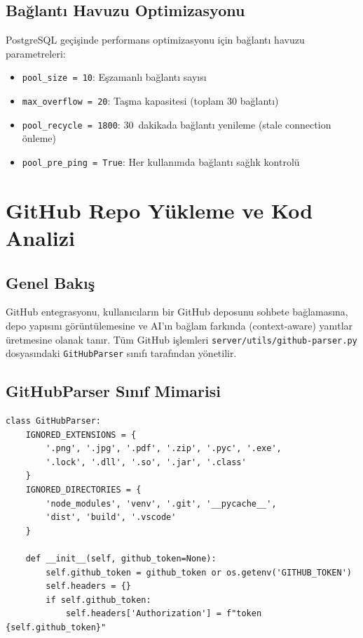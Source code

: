 \documentclass[12pt,a4paper]{article}
\begin{document}
\subsection{Bağlantı Havuzu Optimizasyonu}

PostgreSQL geçişinde performans optimizasyonu için bağlantı havuzu parametreleri:

\begin{itemize}
    \item \texttt{pool\_size = 10}: Eşzamanlı bağlantı sayısı
    \item \texttt{max\_overflow = 20}: Taşma kapasitesi (toplam 30 bağlantı)
    \item \texttt{pool\_recycle = 1800}: 30~dakikada bağlantı yenileme (stale connection önleme)
    \item \texttt{pool\_pre\_ping = True}: Her kullanımda bağlantı sağlık kontrolü
\end{itemize}

\section{GitHub Repo Yükleme ve Kod Analizi}
\label{sec:github}

\subsection{Genel Bakış}

GitHub entegrasyonu, kullanıcıların bir GitHub deposunu sohbete bağlamasına, depo yapısını görüntülemesine ve AI'ın bağlam farkında (context-aware) yanıtlar üretmesine olanak tanır. Tüm GitHub işlemleri \texttt{server/utils/github-parser.py} dosyasındaki \texttt{GitHubParser} sınıfı tarafından yönetilir.

\subsection{GitHubParser Sınıf Mimarisi}

\begin{lstlisting}[style=pythonstyle, caption={GitHubParser Sınıfı --- Temel Yapı (github-parser.py)}, label=lst:ghparser]
class GitHubParser:
    IGNORED_EXTENSIONS = {
        '.png', '.jpg', '.pdf', '.zip', '.pyc', '.exe',
        '.lock', '.dll', '.so', '.jar', '.class'
    }
    IGNORED_DIRECTORIES = {
        'node_modules', 'venv', '.git', '__pycache__',
        'dist', 'build', '.vscode'
    }
    
    def __init__(self, github_token=None):
        self.github_token = github_token or os.getenv('GITHUB_TOKEN')
        self.headers = {}
        if self.github_token:
            self.headers['Authorization'] = f"token {self.github_token}"
\end{lstlisting}
\end{document}

